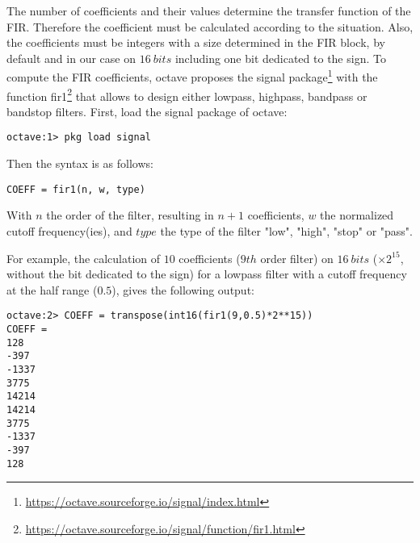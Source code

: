 \documentclass[12pt,oneside]{article}
\begin{document}
The number of coefficients and their values determine the transfer function of the FIR. Therefore the coefficient must be calculated according to the situation. Also, the coefficients must be integers with a size determined in the FIR block, by default and in our case on $16~bits$ including one bit dedicated to the sign. 
\newline\newline
To compute the FIR coefficients, octave proposes the signal package\footnote{\href{https://octave.sourceforge.io/signal/index.html}{https://octave.sourceforge.io/signal/index.html}} with the function fir1\footnote{\href{https://octave.sourceforge.io/signal/function/fir1.html}{https://octave.sourceforge.io/signal/function/fir1.html}} that allows to design either lowpass, highpass, bandpass or bandstop filters. First, load the signal package of octave:

\vspace{0.2cm}
\begin{lstlisting}
octave:1> pkg load signal
\end{lstlisting}
\vspace{+0.5cm}

Then the syntax is as follows:

\vspace{-0.1cm}
\begin{lstlisting}
COEFF = fir1(n, w, type)
\end{lstlisting}
\vspace{+0.5cm}

With $n$ the order of the filter, resulting in $n+1$ coefficients, $w$ the normalized cutoff frequency(ies), and $type$ the type of the filter "low", "high", "stop" or "pass". 

For example, the calculation of $10$ coefficients ($9th$ order filter) on $16~bits$ ($\times 2^{15}$, without the bit dedicated to the sign) for a lowpass filter with a cutoff frequency at the half range ($0.5$), gives the following output: 

\vspace{-0.1cm}
\begin{lstlisting}
octave:2> COEFF = transpose(int16(fir1(9,0.5)*2**15))
COEFF =
128
-397
-1337
3775
14214
14214
3775
-1337
-397
128
\end{lstlisting}
\vspace{+0.5cm}
\end{document}
